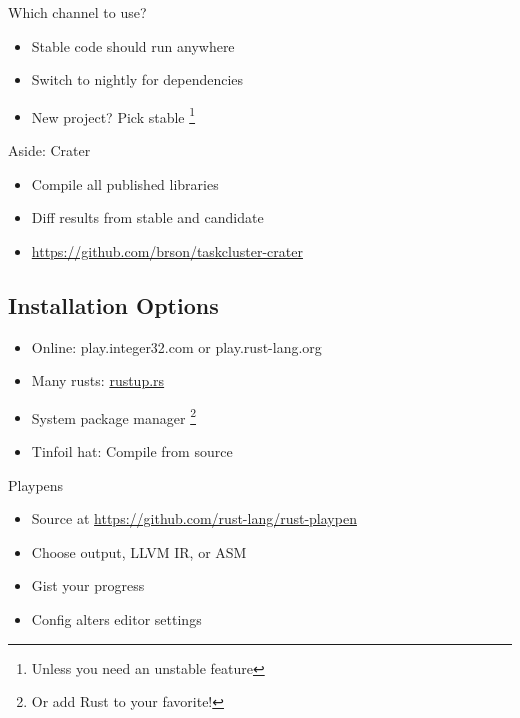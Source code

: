 \documentclass[50pt]{beamer}
\begin{document}
    \begin{frame}
        Which channel to use?
        \begin{itemize}
            \item Stable code should run anywhere
            \item Switch to nightly for dependencies
            \item New project? Pick stable \footnote{Unless you need an
                  unstable feature}
        \end{itemize}
    \end{frame}

    \begin{frame}
        Aside: Crater
        \begin{itemize}
            \item Compile all published libraries
            \item Diff results from stable and candidate
            \item \url{https://github.com/brson/taskcluster-crater}
        \end{itemize}
    \end{frame}

    \subsection{Installation Options}

    \begin{frame}
        \begin{itemize}
            \item Online: play.integer32.com or play.rust-lang.org
            \item Many rusts: \url{rustup.rs}
            \item System package manager \footnote{Or add Rust to your favorite!}
            \item Tinfoil hat: Compile from source
        \end{itemize}
    \end{frame}

    \begin{frame}
        Playpens
        \begin{itemize}
            \item Source at \url{https://github.com/rust-lang/rust-playpen}
            \item Choose output, LLVM IR, or ASM
            \item Gist your progress
            \item Config alters editor settings
        \end{itemize}
    \end{frame}
\end{document}
